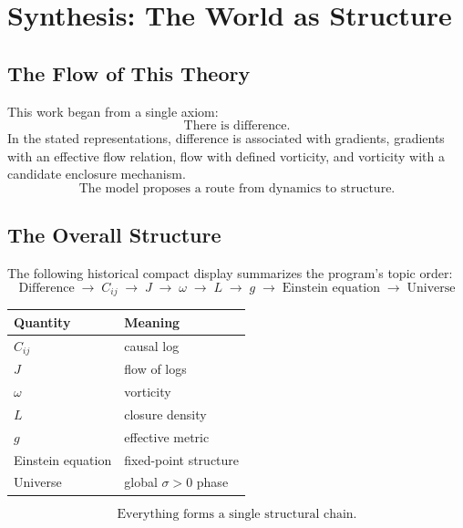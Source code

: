 \section{Synthesis: The World as Structure}
\label{sec:synthesis}

\subsection{The Flow of This Theory}

This work began from a single axiom:
\begin{equation}
  \boxed{\text{There is difference.}}
\end{equation}
In the stated representations, difference is associated with gradients,
gradients with an effective flow relation, flow with defined vorticity, and
vorticity with a candidate enclosure mechanism.
\begin{equation}
  \boxed{\text{The model proposes a route from dynamics to structure.}}
\end{equation}

\subsection{The Overall Structure}

The following historical compact display summarizes the program's topic order:
\begin{equation}
  \boxed{
    \text{Difference}
    \;\to\; C_{ij}
    \;\to\; J
    \;\to\; \omega
    \;\to\; L
    \;\to\; g
    \;\to\; \text{Einstein equation}
    \;\to\; \text{Universe}
  }
\end{equation}
\begin{center}
\begin{tabular}{ll}
\toprule
Quantity & Meaning \\
\midrule
$C_{ij}$ & causal log \\
$J$ & flow of logs \\
$\omega$ & vorticity \\
$L$ & closure density \\
$g$ & effective metric \\
Einstein equation & fixed-point structure \\
Universe & global $\sigma > 0$ phase \\
\bottomrule
\end{tabular}
\end{center}
\begin{equation}
  \boxed{\text{Everything forms a single structural chain.}}
\end{equation}

